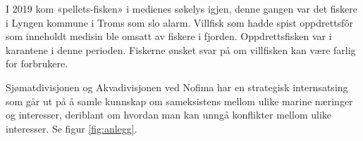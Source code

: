 


I 2019 kom «pellets-fisken» i medienes søkelys igjen, denne gangen var det fiskere i Lyngen kommune i Troms som slo alarm. Villfisk som hadde spist oppdrettsfôr som inneholdt medisin ble omsatt av fiskere i fjorden. Oppdrettsfisken var i karantene i denne perioden. Fiskerne ønsket svar på om villfisken kan være farlig for forbrukere. \cite{Trana m.fl. 2019}


Sjømatdivisjonen og Akvadivisjonen ved Nofima har en strategisk internsatsing som går ut på å samle kunnskap om sameksistens mellom ulike marine næringer og interesser, deriblant om hvordan man kan unngå konflikter mellom ulike interesser. Se figur \ref{fig:anlegg}. \cite{Robertsen 2020}

